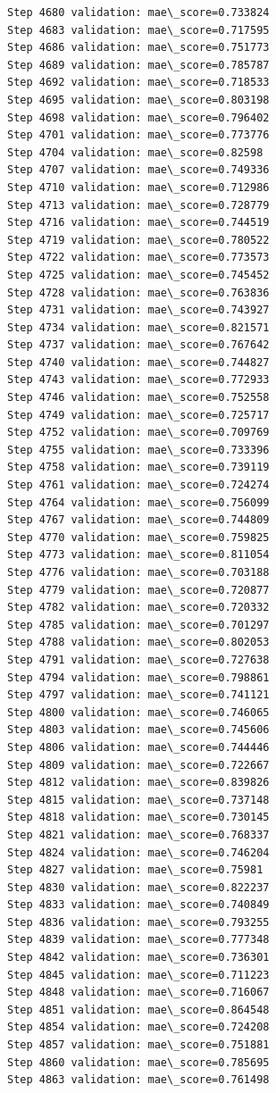 \documentclass[11pt]{article}
\begin{document}
\begin{Verbatim}[commandchars=\\\{\}]
Step 4680 validation: mae\_score=0.733824
Step 4683 validation: mae\_score=0.717595
Step 4686 validation: mae\_score=0.751773
Step 4689 validation: mae\_score=0.785787
Step 4692 validation: mae\_score=0.718533
Step 4695 validation: mae\_score=0.803198
Step 4698 validation: mae\_score=0.796402
Step 4701 validation: mae\_score=0.773776
Step 4704 validation: mae\_score=0.82598
Step 4707 validation: mae\_score=0.749336
Step 4710 validation: mae\_score=0.712986
Step 4713 validation: mae\_score=0.728779
Step 4716 validation: mae\_score=0.744519
Step 4719 validation: mae\_score=0.780522
Step 4722 validation: mae\_score=0.773573
Step 4725 validation: mae\_score=0.745452
Step 4728 validation: mae\_score=0.763836
Step 4731 validation: mae\_score=0.743927
Step 4734 validation: mae\_score=0.821571
Step 4737 validation: mae\_score=0.767642
Step 4740 validation: mae\_score=0.744827
Step 4743 validation: mae\_score=0.772933
Step 4746 validation: mae\_score=0.752558
Step 4749 validation: mae\_score=0.725717
Step 4752 validation: mae\_score=0.709769
Step 4755 validation: mae\_score=0.733396
Step 4758 validation: mae\_score=0.739119
Step 4761 validation: mae\_score=0.724274
Step 4764 validation: mae\_score=0.756099
Step 4767 validation: mae\_score=0.744809
Step 4770 validation: mae\_score=0.759825
Step 4773 validation: mae\_score=0.811054
Step 4776 validation: mae\_score=0.703188
Step 4779 validation: mae\_score=0.720877
Step 4782 validation: mae\_score=0.720332
Step 4785 validation: mae\_score=0.701297
Step 4788 validation: mae\_score=0.802053
Step 4791 validation: mae\_score=0.727638
Step 4794 validation: mae\_score=0.798861
Step 4797 validation: mae\_score=0.741121
Step 4800 validation: mae\_score=0.746065
Step 4803 validation: mae\_score=0.745606
Step 4806 validation: mae\_score=0.744446
Step 4809 validation: mae\_score=0.722667
Step 4812 validation: mae\_score=0.839826
Step 4815 validation: mae\_score=0.737148
Step 4818 validation: mae\_score=0.730145
Step 4821 validation: mae\_score=0.768337
Step 4824 validation: mae\_score=0.746204
Step 4827 validation: mae\_score=0.75981
Step 4830 validation: mae\_score=0.822237
Step 4833 validation: mae\_score=0.740849
Step 4836 validation: mae\_score=0.793255
Step 4839 validation: mae\_score=0.777348
Step 4842 validation: mae\_score=0.736301
Step 4845 validation: mae\_score=0.711223
Step 4848 validation: mae\_score=0.716067
Step 4851 validation: mae\_score=0.864548
Step 4854 validation: mae\_score=0.724208
Step 4857 validation: mae\_score=0.751881
Step 4860 validation: mae\_score=0.785695
Step 4863 validation: mae\_score=0.761498

\end{Verbatim}
\end{document}
